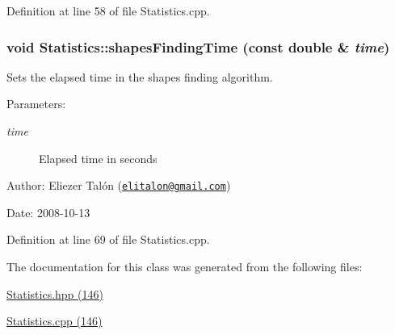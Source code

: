 Definition at line 58 of file Statistics.cpp.\hypertarget{class_statistics_bc0a0e96adba6828ffb915a617b58ed2}{
\subsubsection[shapesFindingTime]{\setlength{\rightskip}{0pt plus 5cm}void Statistics::shapesFindingTime (const double \& {\em time})}}
\label{class_statistics_bc0a0e96adba6828ffb915a617b58ed2}


Sets the elapsed time in the shapes finding algorithm. 

\begin{Desc}
\item[Parameters:]
\begin{description}
\item[{\em time}]Elapsed time in seconds\end{description}
\end{Desc}
\begin{Desc}
\item[Author:]Eliezer Talón (\href{mailto:elitalon@gmail.com}{\tt elitalon@gmail.com}) \end{Desc}
\begin{Desc}
\item[Date:]2008-10-13 \end{Desc}


Definition at line 69 of file Statistics.cpp.

The documentation for this class was generated from the following files:\begin{CompactItemize}
\item 
\hyperlink{_statistics_8hpp}{Statistics.hpp (146)}\item 
\hyperlink{_statistics_8cpp}{Statistics.cpp (146)}\end{CompactItemize}
